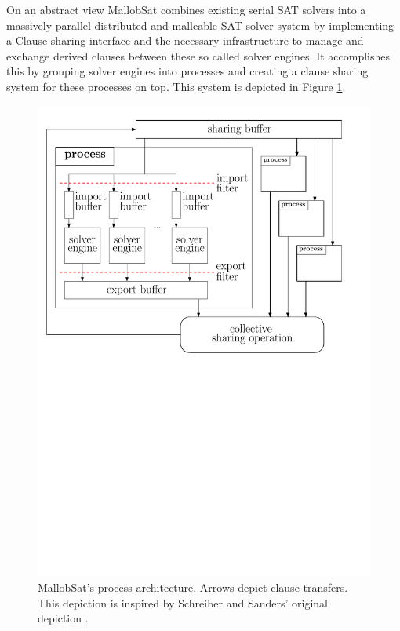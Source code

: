 \documentclass[12pt,a4paper,twoside]{scrartcl}
\numberwithin{equation}{section}
\begin{document}
On an abstract view MallobSat combines existing serial SAT solvers into a massively parallel distributed and malleable SAT solver system by implementing a Clause sharing interface and the necessary infrastructure to manage and exchange derived clauses between these so called solver engines. It accomplishes this by grouping solver engines into processes and creating a clause sharing system for these processes on top. This system is depicted in Figure \ref{fig:architectureMallob}.

\begin{figure}
  \center
  \includegraphics[scale=.8]{figures/mallob_architecture.pdf}
  \caption{MallobSat's process architecture. Arrows depict clause transfers. This depiction is inspired by Schreiber and Sanders' original depiction \cite{mallobSat}.}
  \label{fig:architectureMallob}
\end{figure}
\end{document}
